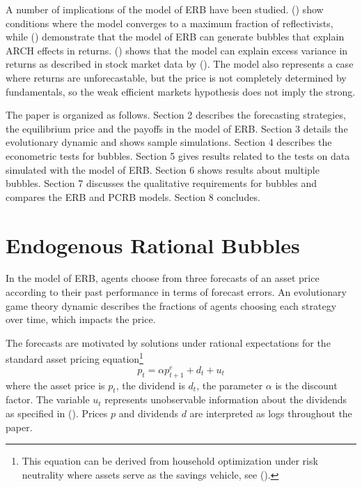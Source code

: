 \documentclass[12pt]{article}
\begin{document}
A number of implications of the model of ERB have been studied. \citeauthor{Waters2014} (\citeyear{Waters2014}) show conditions where the model converges to a maximum fraction of reflectivists, while \citeauthor{waters2007} (\citeyear{waters2007}) demonstrate that the model of ERB can generate bubbles that explain ARCH effects in returns. \citeauthor{Waters2018} (\citeyear{Waters2018}) shows that the model can explain excess variance in returns as described in stock market data by \citeauthor{shiller1981stock} (\citeyear{shiller1981stock}). The model also represents a case where returns are unforecastable, but the price is not completely determined by fundamentals, so the weak efficient markets hypothesis does not imply the strong.

The paper is organized as follows. Section 2 describes the forecasting strategies, the equilibrium price and the payoffs in the model of ERB. Section 3 details the evolutionary dynamic and shows sample simulations. Section 4 describes the econometric tests for bubbles. Section 5 gives results related to the tests on data simulated with the model of ERB. Section 6 shows results about multiple bubbles. Section 7 discusses the qualitative requirements for bubbles and compares the ERB and PCRB models. Section 8 concludes.

\section{Endogenous Rational Bubbles}

In the model of ERB, agents choose from three forecasts of an asset price according to their past performance in terms of forecast errors. An evolutionary game theory dynamic describes the fractions of agents choosing each strategy over time, which impacts the price. 

The forecasts are motivated by solutions under rational expectations for the standard asset pricing equation\footnote{This equation can be derived from household optimization under risk neutrality where assets serve as the savings vehicle, see \citeauthor{cochrane2001asset} (\citeyear{cochrane2001asset}).}
\begin{equation*}
p_{t}=\alpha p_{t+1}^{e}+d_{t}+u_{t} \label{model}
\end{equation*}
where the asset price is $p_{t}$, the dividend is $d_{t}$, the parameter $\alpha$ is the discount factor. The variable $u_{t}$ represents unobservable information about the dividends as specified in \citeauthor{phillips2015testing} (\citeyear{phillips2015testing}). Prices $p$ and dividends $d$ are interpreted as logs throughout the paper. 
\end{document}
